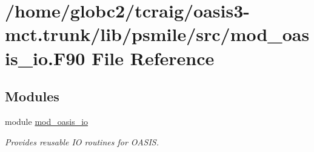 \hypertarget{mod__oasis__io_8_f90}{}\section{/home/globc2/tcraig/oasis3-\/mct.trunk/lib/psmile/src/mod\+\_\+oasis\+\_\+io.F90 File Reference}
\label{mod__oasis__io_8_f90}
\subsection*{Modules}
\begin{DoxyCompactItemize}
\item 
module \hyperlink{namespacemod__oasis__io}{mod\+\_\+oasis\+\_\+io}
\begin{DoxyCompactList}\small\item\em Provides reusable IO routines for O\+A\+S\+IS. \end{DoxyCompactList}\end{DoxyCompactItemize}
